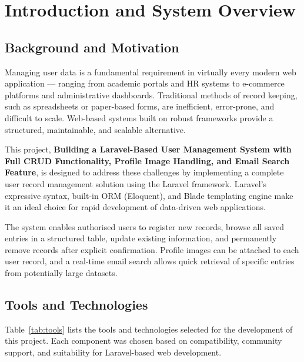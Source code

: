 \documentclass[12pt,a4paper]{report}
\begin{document}
\chapter{Introduction and System Overview}

\section{Background and Motivation}

Managing user data is a fundamental requirement in virtually every modern web
application — ranging from academic portals and HR systems to e-commerce platforms
and administrative dashboards. Traditional methods of record keeping, such as
spreadsheets or paper-based forms, are inefficient, error-prone, and difficult to scale.
Web-based systems built on robust frameworks provide a structured, maintainable, and
scalable alternative.

This project, \textbf{Building a Laravel-Based User Management System with Full
CRUD Functionality, Profile Image Handling, and Email Search Feature}, is designed
to address these challenges by implementing a complete user record management
solution using the Laravel framework. Laravel's expressive syntax, built-in ORM
(Eloquent), and Blade templating engine make it an ideal choice for rapid development
of data-driven web applications.

The system enables authorised users to register new records, browse all saved entries
in a structured table, update existing information, and permanently remove records
after explicit confirmation. Profile images can be attached to each user record, and a
real-time email search allows quick retrieval of specific entries from potentially large
datasets.

\section{Tools and Technologies}

Table~\ref{tab:tools} lists the tools and technologies selected for the development of
this project. Each component was chosen based on compatibility, community support,
and suitability for Laravel-based web development.
\end{document}
